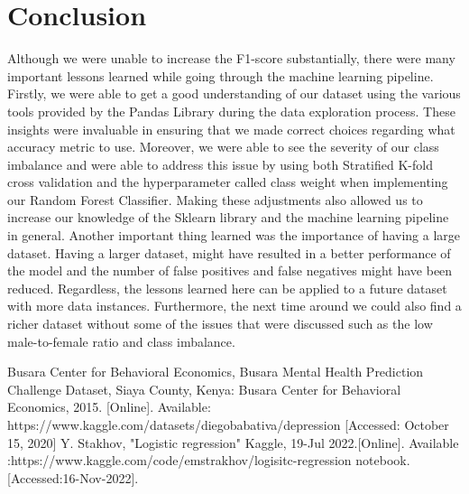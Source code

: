 \documentclass[conference]{IEEEtran}
\begin{document}
\section{Conclusion}
Although we were unable to increase the F1-score substantially, there were many important lessons learned while going through the machine learning pipeline.  Firstly, we were able to get a good understanding of our dataset using the various tools provided by the Pandas Library during the data exploration process. These insights were invaluable in ensuring that we made correct choices regarding what accuracy metric to use. Moreover, we were able to see the severity of our class imbalance and were able to address this issue by using both Stratified K-fold cross validation and the hyperparameter called class weight when implementing our Random Forest Classifier. Making these adjustments also allowed us to increase our knowledge of the Sklearn library and the machine learning pipeline in general. Another important thing learned was the importance of having a large dataset. Having a larger dataset, might have resulted in a better performance of the model and the number of false positives and false negatives might have been reduced. Regardless, the lessons learned here can be applied to a future dataset with more data instances. Furthermore, the next time around we could also find a richer dataset without some of the issues that were discussed such as the low male-to-female ratio and class imbalance.



\begin{thebibliography}{00}
 Busara Center for Behavioral Economics, Busara Mental Health Prediction Challenge Dataset, Siaya County, Kenya: Busara Center for Behavioral Economics, 2015. [Online]. Available: https://www.kaggle.com/datasets/diegobabativa/depression [Accessed: October 15, 2020]
 Y. Stakhov, "Logistic regression" Kaggle, 19-Jul 2022.[Online]. Available :https://www.kaggle.com/code/emstrakhov/logisitc-regression notebook. [Accessed:16-Nov-2022].


\end{thebibliography}
\vspace{12pt}
\color{red}
\end{document}
